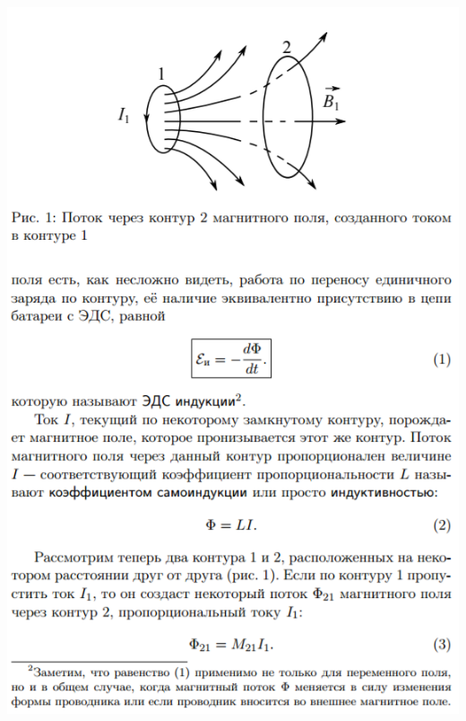 \documentclass[12pt]{article}
\begin{document}
\begin{center}
    	\includegraphics[width=15cm]{theory2.png}

\end{center}
\end{document}
